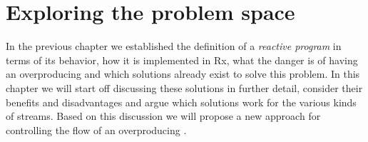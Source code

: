 \chapter{Exploring the problem space}
In the previous chapter we established the definition of a \textit{reactive program} in terms of its behavior, how it is implemented in Rx, what the danger is of having an overproducing \obs and which solutions already exist to solve this problem. In this chapter we will start off discussing these solutions in further detail, consider their benefits and disadvantages and argue which solutions work for the various kinds of streams. Based on this discussion we will propose a new approach for controlling the flow of an overproducing \obs.





